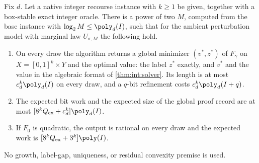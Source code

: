 \begin{theorem}\label{thm:int:native}
Fix $d$. Let a native integer recourse instance with $k\ge1$ be given,
together with a box-stable exact integer oracle. There is a power of two $M$,
computed from the base instance with $\log_2M\le\poly_d(I)$, such that for the
ambient perturbation model with marginal law $U_{\sigma,M}$ the following
hold.
\begin{enumerate}[label=(\roman*)]
\item On every draw the algorithm returns a global minimizer $(v^*,z^*)$ of
$F_\gamma$ on $X=[0,1]^k\times Y$ and the optimal value: the label $z^*$
exactly, and $v^*$ and the value in the algebraic format of
\cref{thm:int:solver}. Its length is at most $c_d^k\poly_d(I)$ on every
draw, and a $q$-bit refinement costs $c_d^k\poly_d(I+q)$.
\item The expected bit work and the expected size of the global proof record
are at most $[8^kQ_{\rm ex}+c_d^k]\poly_d(I)$.
\item If $F_0$ is quadratic, the output is rational on every draw and the
expected work is $[8^kQ_{\rm ex}+3^k]\poly(I)$.
\end{enumerate}
No growth, label-gap, uniqueness, or residual convexity premise is used.
\end{theorem}

